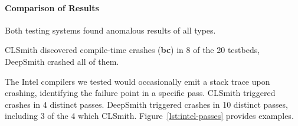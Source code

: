 


\paragraph{Comparison of Results} %
Both testing systems found anomalous results of all types.

CLSmith discovered compile-time crashes (\textbf{bc}) in 8 of the 20 testbeds, DeepSmith crashed all of them.

The Intel compilers we tested would occasionally emit a stack trace upon crashing, identifying the failure point in a specific pass. CLSmith triggered crashes in 4 distinct passes. DeepSmith triggered crashes in 10 distinct passes, including 3 of the 4 which CLSmith. Figure~\ref{lst:intel-passes} provides examples.


%

